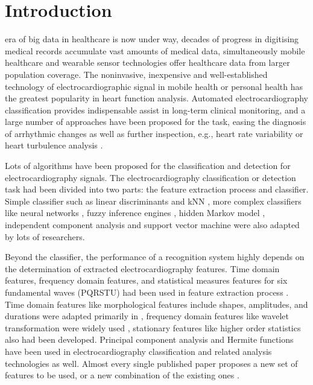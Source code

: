 \documentclass[journal]{IEEEtran}
\begin{document}
\section{Introduction}
% 
% 
% 
% 
 era of big data in healthcare is now under way, decades of progress in digitising medical records accumulate vast amounts of medical data, simultaneously mobile healthcare and wearable sensor technologies offer healthcare data from larger population coverage.
The noninvasive, inexpensive and well-established technology of electrocardiographic signal in mobile health or personal health has the greatest popularity in heart function analysis.
Automated electrocardiography classification provides indispensable assist in long-term clinical monitoring, and a large number of approaches have been proposed for the task, easing the diagnosis of arrhythmic changes as well as further inspection, e.g., heart rate variability or heart turbulence analysis \cite{mar}. 


Lots of algorithms have been proposed for the classification and detection for electrocardiography signals. 
The electrocardiography classification or detection task had been divided into two parts: the feature extraction process and classifier. 
Simple classifier such as linear discriminants \cite{chaza} and kNN \cite{melgan}, more complex classifiers like neural networks \cite{jiang, olmez, lin, osowski}, fuzzy inference engines \cite{osowski, kundu}, hidden Markov model \cite{andreao, coast}, independent component analysis \cite{zhu} and support vector machine  \cite{melgan, kampoura, khandoker} were also adapted by lots of researchers.  

 
Beyond the classifier, the performance of a recognition system highly depends on the determination of extracted electrocardiography features. Time domain features, frequency domain features, and statistical measures features for six fundamental waves (PQRSTU) had been used in feature extraction process \cite{chia}. 
Time domain features like morphological features include shapes, amplitudes, and durations were adapted primarily in \cite{jekova, christove, can}, frequency domain features like wavelet transformation were widely used \cite{inan}, \cite{banerjee} stationary features like higher order statistics also had been developed. 
Principal component analysis \cite{stam} and Hermite functions \cite{lager} have been used in electrocardiography classification and related analysis technologies as well.
Almost every single published paper proposes a new set of features to be used, or a new combination of the existing ones \cite{mar}.
\end{document}
